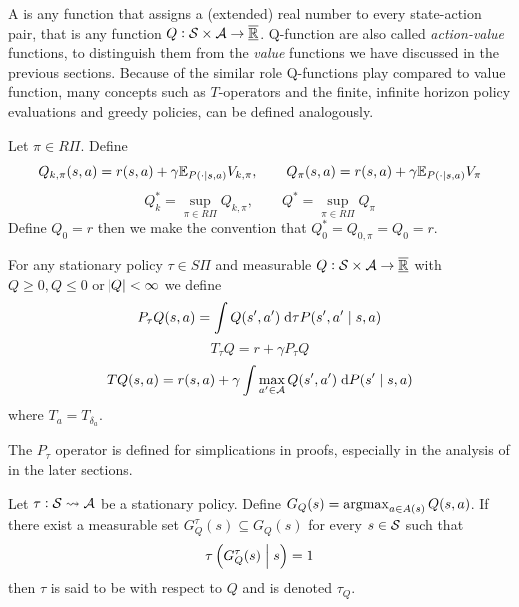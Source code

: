 A  is any function that assigns a (extended) real number
to every state-action pair, that is any function $Q : \mathcal{S} \times \mathcal{A}
\to \overline{\underline{\mathbb{R}}}$. Q-function are also called \emph{action-value} functions,
to distinguish them from the \emph{value} functions we have discussed in the
previous sections.
Because of the similar role Q-functions play compared to value function,
many concepts such as $T$-operators and the finite, infinite horizon
policy evaluations and greedy policies, can be defined analogously.

\begin{defn}
  Let $\pi \in R\Pi$.
  Define
  \[ Q_{k, \pi}(s, a) = r(s, a) + \gamma \mathbb{E}_{P(\cdot \mid s, a)} V_{k, \pi}
  ,\qquad Q_\pi(s, a) = r(s, a) + \gamma \mathbb{E}_{P(\cdot \mid s, a)} V_\pi \]
  \[ Q^*_k = \sup_{\pi \in R\Pi} Q_{k, \pi}
  , \qquad Q^* = \sup_{\pi \in R\Pi} Q_\pi \]
  Define $Q_0 = r$ then we make the convention that
  $Q^*_0 = Q_{0,\pi} = Q_0 = r$.
  \label{defn:polEvalQ}
\end{defn}
\begin{defn}
  For any stationary policy $\tau \in S\Pi$
  and measurable $Q:\mathcal{S} \times \mathcal{A} \to \overline{\underline{\mathbb{R}}}$ with
  $Q \geq 0, Q \leq 0$ or $\abs{Q} < \infty$ we define
  \[ P_\tau Q(s, a) = \int Q(s', a') \; \mathrm{d} \tau P(s', a' \mid s, a) \]
  \[ T_\tau Q = r + \gamma P_\tau Q \]
  \[ T Q(s, a) = r(s, a) + \gamma
  \int \max_{a' \in \mathcal{A}} Q(s', a') \; \mathrm{d} P(s' \mid s, a) \]
  where $T_a = T_{\delta_a}$.
  \label{defn:opQ}
\end{defn}
\begin{rem}
  The $P_\tau$ operator is defined for simplications in proofs, especially
  in the analysis of  in the later sections.
\end{rem}
\begin{defn}
  Let $\tau : \mathcal{S} \leadsto \mathcal{A}$ be a stationary policy. Define
  $G_Q(s) = \operatorname*{argmax}_{a \in A(s)} Q(s, a)$.
  If there exist a measurable set $G_Q^\tau(s) \subseteq G_Q(s)$
  for every $s \in \mathcal{S}$ such that
  \[ \tau \left( G_Q^\tau(s) \;\middle\vert\; s \right) = 1 \]
  then $\tau$ is said to be  with respect to $Q$ and is
  denoted $\tau_Q$.
  \label{defn:greedyQ}
\end{defn}


